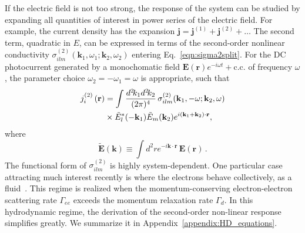 \documentclass[aps, prb, reprint, superscriptaddress]{revtex4-2}
\renewcommand{\vec}{\mathbf}
\begin{document}
If the electric field is not too strong, the response of the system can be studied
by expanding all quantities of interest in power series of the electric field.
For example, the current density has the expansion $\vec{j} = \vec{j}^{(1)} + \vec{j}^{(2)} + \ldots$
The second term, quadratic in $E$, can be expressed in terms of the second-order nonlinear conductivity
$\sigma_{ilm}^{(2)}\left(\vec{k}_1, \omega_1;\vec{k}_2, \omega_2\right)$ entering
Eq.~\eqref{eqn:sigma2split}.
For the DC photocurrent generated by a monochomatic field $\vec{E}(\vec{r}) e^{-i \omega t} + \mathrm{c.c.}$ of frequency $\omega$,
the parameter choice $\omega_2 = -\omega_1 = \omega$ is appropriate,
such that
\begin{align}
	j_i^{(2)}\left(\vec{r}\right) &=
	\int \frac{d^2\! {k}_1 d^2\! {k}_2}{(2\pi)^4}\,
	\sigma_{ilm}^{(2)} (\vec{k}_1, -\omega;
	\vec{k}_2, \omega)
	\notag \\
	&\times \tilde{E}_l^* (-\vec{k}_1) \tilde{E}_m(\vec{k}_2)  e^{i (\vec{k}_1 + \vec{k}_2) \cdot \vec{r}},
	\label{eqn:j_from_sigma^2}
\end{align}
where
\begin{equation}
	\tilde{\vec{E}}(\vec{k}) \equiv
	\int d^2 r  e^{-i \vec{k} \cdot \vec{r}}\, \vec{E}(\vec{r})\,.
	\label{eqn:tildeE}
\end{equation}
The functional form of $\sigma_{ilm}^{(2)}$ is highly system-dependent. 
One particular case attracting much interest recently is where the electrons behave collectively, as a fluid~\cite{Lucas2018}. 
This regime is realized when the momentum-conserving electron-electron scattering rate $\Gamma_{ee}$ exceeds the momentum relaxation rate $\Gamma_d$. 
In this hydrodynamic regime, the derivation of the second-order non-linear response simplifies greatly. 
We summarize it in Appendix~\ref{appendix:HD_equations}. 
\end{document}
